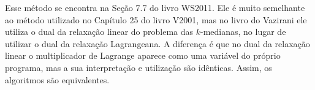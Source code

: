 Esse método se encontra na Seção 7.7 do livro WS2011. Ele é muito semelhante ao método utilizado no Capítulo 25 do livro V2001, mas no livro do Vazirani ele utiliza o dual da relaxação linear do problema das $k$-medianas, no lugar de utilizar o dual da relaxação Lagrangeana. A diferença é que no dual da relaxação linear o multiplicador de Lagrange aparece como uma variável do próprio programa, mas a sua interpretação e utilização são idênticas. Assim, os algoritmos são equivalentes.